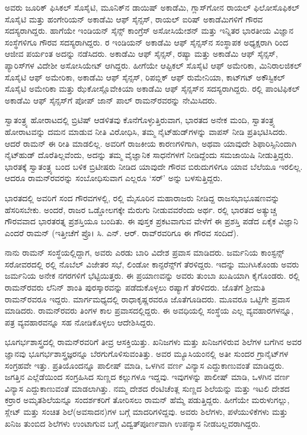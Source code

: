 ಅವರು ಜೂರಿಕ್ ಫಿಸಿಕಲ್ ಸೊಸೈಟಿ, ಮೂನಿಕ್‌ನ ಡಾಯಿಷ್ ಅಕಾಡೆಮಿ, ಗ್ಲಾಸ್‌ಗೋನ ರಾಯಲ್ ಫಿಲೋಸೊಫಿಕಲ್ ಸೊಸೈಟಿ ಮತ್ತು ಹಂಗೇರಿಯನ್ ಅಕಾಡೆಮಿ ಆಫ್ ಸೈನ್ಸಸ್, ರಾಯಲ್ ಐರಿಷ್ ಅಕಾಡೆಮಿಗಳಿಗೆ ಗೌರವ ಸದಸ್ಯರಾಗಿದ್ದರು. ಹಾಗೆಯೇ ಇಂಡಿಯನ್ ಸೈನ್ಸ್ ಕಾಂಗ್ರೆಸ್ ಅಸೋಸಿಯೇಶನ್ ಮತ್ತು ಇನ್ನಿತರ ಭಾರತೀಯ ವಿಜ್ಞಾನ ಸಂಸ್ಥೆಗಳಿಗೂ ಗೌರವ ಸದಸ್ಯರಾಗಿದ್ದರು.  ರ ಇಂಡಿಯನ್ ಅಕಾಡೆಮಿ ಆಫ್ ಸೈನ್ಸಸ್‌ನ ಸಂಸ್ಥಾಪಕ ಅಧ್ಯಕ್ಷರಾಗಿ  ರಿಂದ ಆಜೀವ ಪರ್ಯಂತ ಅದನ್ನು ನಡೆಸಿದರು. ಅಕಾಡೆಮಿ ಆಫ್ ಸೈನ್ಸಸ್, ರಷ್ಯಾ ಮತ್ತು ಅಕಾಡೆಮಿ ಆಫ್ ಸೈನ್ಸಸ್, ಪ್ಯಾರಿಸ್‍ಗಳ ವಿದೇಶೀ ಅಸೋಸಿಯೇಟ್ ಆಗಿದ್ದರು. ಹೀಗೆಯೇ ಆಪ್ಟಿಕಲ್ ಸೊಸೈಟಿ ಆಫ್ ಅಮೇರಿಕಾ, ಮಿನಿರಾಲಜಿಕಲ್ ಸೊಸೈಟಿ ಆಫ್ ಅಮೇರಿಕಾ, ಅಕಾಡೆಮಿ ಆಫ್ ಸೈನ್ಸಸ್, ರಿಪಬ್ಲಿಕ್ ಆಫ್ ರುಮೇನಿಯಾ, ಕಾಟ್‍ಗಟ್ ಅಕೌಸ್ಟಿಕಲ್ ಸೊಸೈಟಿ ಅಮೇರಿಕಾ ಮತ್ತು ಝೆಕೋಸ್ಲೊವೇಕಿಯಾ ಅಕಾಡೆಮಿ ಆಫ್ ಸೈನ್ಸಸ್‌ನ ಸದಸ್ಯರಾಗಿದ್ದರು.  ರಲ್ಲಿ ಪಾಂಟಿಫಿಕಲ್ ಅಕಾಡೆಮಿ ಆಫ್ ಸೈನ್ಸಸ್‌ಗೆ ಪೋಪ್ ಜಾನ್ ಪಾಲ್ ರಾಮನ್‍ರವರನ್ನು ನೇಮಿಸಿದರು.

ಸ್ವಾತಂತ್ರ್ಯ ಹೋರಾಟದಲ್ಲಿ ಬ್ರಿಟಿಷ್ ಆಡಳಿತವು ಕೊನೆಗೊಳ್ಳುತ್ತಿರುವಾಗ, ಭಾರತದ ಅನೇಕ ಮಂದಿ, ಸ್ವಾತಂತ್ರ್ಯ ಹೋರಾಟವನ್ನು ದಮನ ಮಾಡುವ ನೀತಿ ವಿರೋಧಿಸಿ, ತಮ್ಮ ನೈಟ್‍ಹುಡ್‍‌ಗಳನ್ನು ವಾಪಸ್ ನೀಡಿ ಪ್ರತಿಭಟಿಸಿದರು. ಆದರೆ ರಾಮನ್‍ ಈ ರೀತಿ ಮಾಡಲಿಲ್ಲ. ಅವರಿಗೆ ರಾಜಕೀಯ ಕಾರಣಗಳಿಗಾಗಿ, ಅಥವಾ ಯಾವುದೇ ಶಿಫಾರಿಸ್ಸಿನಿಂದಾಗಿ ನೈಟ್‍ಹುಡ್ ದೊರೆತಿಲ್ಲವೆಂದು, ಅದನ್ನು ತಮ್ಮ ವೈಜ್ಞಾನಿಕ ಸಾಧನೆಗಳಗೆ ನೀಡಿದ್ದೆಂದು ಸಮಜಾಯಿಷಿ ನೀಡುತ್ತಿದ್ದರು. ಭಾರತಕ್ಕೆ ಸ್ವಾತಂತ್ರ್ಯ ಬಂದ ಬಳಿಕ ಬ್ರಿಟೀಷರು ನೀಡಿದ ಯಾವುದೇ ಗೌರವ ಬಿರುದುಗಳಿಗೂ ಯಾವ ಬೆಲೆಯೂ ಇರಲಿಲ್ಲ. ಆದರೂ ರಾಮನ್‍ರವರನ್ನು ಸಂಬೋಧಿಸುವಾಗ ಎಲ್ಲರೂ ‘ಸರ್‍’ ಅನ್ನು ಬಳಸುತ್ತಿದ್ದರು.

\newpage

ಭಾರತದಲ್ಲಿ ಅವರಿಗೆ ಸಂದ ಗೌರವಗಳಲ್ಲಿ,  ರಲ್ಲಿ ಮೈಸೂರಿನ ಮಹಾರಾಜರು ನೀಡಿದ್ದ \break ರಾಜಸಭಾಭೂಷಣವನ್ನು ಹೆಸರಿಸಬೇಕು. ಅಂದರೆ, ರಾಜರ ಒಡ್ಡೋಲಗಕ್ಕೇ ಮೆರುಗು ನೀಡುವವ\-ರೆಂದು ಅರ್ಥ. ರಲ್ಲಿ ಭಾರತದ ಅತ್ಯುಚ್ಚ ಗೌರವವಾದ ಭಾರತರತ್ನ ಪ್ರಶಸ್ತಿಯೂ ಬಂದಿತು. ಈ ಪುಸ್ತಕ ಪ್ರಕಟವಾಗುವ ವೇಳೆಗೆ ಈ ಪ್ರಶಸ್ತಿ ಪಡೆದ ಏಕೈಕ ವಿಜ್ಞಾನಿ ಎಂದರೆ ರಾಮನ್ (ಇತ್ತೀಚೆಗೆ ಪ್ರೊ। ಸಿ. ಎನ್. ಆರ್. ರಾವ್‌ರವರಿಗೂ ಈ ಗೌರವ ಸಂದಿದೆ).

ನಾನು ರಾಮನ್ ಸಂಸ್ಥೆಯಲ್ಲಿದ್ದಾಗ, ಅವರು ಎರಡು ಬಾರಿ ವಿದೇಶ ಪ್ರವಾಸ ಮಾಡಿದರು. ಜರ್ಮನಿಯ ಕಾಂಸ್ಟನ್ಸ್ ಸರೋವರದಲ್ಲಿ  ರಲ್ಲಿ ನೊಬೆಲ್ ವಿಜೇತರ ಸಭೆ, ಲಿಂಡೋ ಕಾನ್ಫರೆನ್ಸ್‌ಗೆ ತೆರಳಿದ್ದರು. ಇದನ್ನು ಮುಗಿಸಿಕೊಂಡು ಅವರು ಜರ್ಮನಿಯ ಅನೇಕ ನಗರಗಳಿಗೆ ಭೆಟ್ಟಿಯಿತ್ತರು. ಈ ಪ್ರಯಾಣವನ್ನು ಅವರು ತುಂಬಾ ಖುಷಿಯಾಗಿ ಕೈಗೊಂಡರು. ರಲ್ಲಿ ರಾಮನ್‍ರವರು ಲೆನಿನ್ ಶಾಂತಿ ಪುರಸ್ಕಾರವನ್ನು ಪಡೆದುಕೊಳ್ಳಲು ರಷ್ಯಾಗೆ ತೆರಳಿದರು. ಜೊತೆಗೆ ಶ‍್ರೀಮತಿ ರಾಮನ್‌ರವರೂ ಇದ್ದರು. ಮಾರ್ಗಮಧ‍್ಯದಲ್ಲಿ ರಾಧಾಕೃಷ್ಣರವರೂ ಜೊತೆಗೂಡಿದರು. ಮೂವರೂ ಒಟ್ಟಿಗೇ ಪ್ರವಾಸ ಮಾಡಿದರು. ರಾಮನ್‍ರವರು ತಿಂಗಳ ಕಾಲ ಪ್ರವಾಸದಲ್ಲಿದ್ದರು. ಈ ಅವಧಿಯಲ್ಲಿ ಸಂಸ್ಥೆಯ ಎಲ್ಲ ವ್ಯವಹಾರಗಳನ್ನೂ, ಪತ್ರ ವ್ಯವಹಾರವನ್ನೂ ಸಹ ನೋಡಿಕೊಳ್ಳಲು ಆದೇಶಿಸಿದ್ದರು.



ಭೂಗರ್ಭಶಾಸ್ತ್ರದಲ್ಲಿ ರಾಮನ್‍ರವರಿಗೆ ತೀವ್ರ ಆಸಕ್ತಿಯಿತ್ತು. ಖನಿಜಗಳು ಮತ್ತು ಖನಿಜ\-ಗಳಿರುವ ಶಿಲೆಗಳ ಬಗೆಗಿನ ಅವರ ಜ್ಞಾನವು ಭೂಗರ್ಭಶಾಸ್ತ್ರಜ್ಞರನ್ನೂ ಬೆರಗುಗೊಳಿಸುವಂತಿತ್ತು. ಅವರ ಮ್ಯೂಸಿಯಂನಲ್ಲಿ ಅತೀ ಸುಂದರ ಗ್ರಾನೈಟ್‌ಗಳ ಸಂಗ್ರಹವೇ ಇತ್ತು. ಪ್ರತಿಯೊಂದನ್ನೂ ಪಾಲೀಷ್ ಮಾಡಿ, ಒಳಗಿನ ವರ್ಣ ವಿನ್ಯಾಸ ಎದ್ದುಕಾಣುವಂತೆ ಮಾಡಿದ್ದರು. ಜಗತ್ತಿನ ಎಲ್ಲೆಡೆಯಿಂದ ಸಂಗ್ರಹಿಸಿದ ಸುಣ್ಣದ ಕಲ್ಲುಗಳೂ ಇದ್ದವು. ಇವುಗಳನ್ನು ಪಾಲೀಷ್ ಮಾಡಿ, ಒಳಗಿನ ವರ್ಣ ವಿನ್ಯಾಸ ಎದ್ದುಕಾಣುವಂತೆ ಮಾಡಲಾಗಿತ್ತು. ನಮ್ಮ ದೇಶದ ರೆಂಟಿಚೆಂತ್ಲ ಸುಣ್ಣದ ಶಿಲೆಯನ್ನು ಮತ್ತು ಇಟಲಿ ದೇಶದ ಕರ್ರಾರ ಅಮೃತಶಿಲೆಯನ್ನೂ ಸಂದರ್ಶಕರಿಗೆ ತೋರಿಸಲು ರಾಮನ್ ಹೆಮ್ಮೆ ಪಡುತ್ತಿದ್ದರು. ಹೀಗೆಯೇ ಮರುಳುಗಲ್ಲು, ಸ್ಲೇಟ್ ಮತ್ತು ಸಂಚಿತ ಶಿಲೆ(ಅವಸಾದನ)ಗಳ ಬಗ್ಗೆ ಮಾದರಿಗಳಿದ್ದವು. ಅವರು ಶಿಲೆಗಳು, ಪಳೆಯುಳಿಕೆಗಳು ಮತ್ತು ಖನಿಜ ತುಂಬಿದ ಶಿಲೆಗಳು ಉಂಟಾಗುವ ಬಗ್ಗೆ ವಿದ್ವತ್‍ಪೂರ್ಣವಾಗಿ ಉಪನ್ಯಾಸ ನೀಡಬಲ್ಲವರಾಗಿದ್ದರು.

